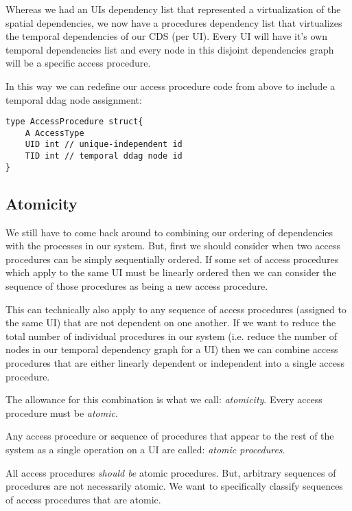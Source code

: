 Whereas we had an UIs dependency list that represented a virtualization of the spatial dependencies, we now have a procedures dependency list that virtualizes the temporal dependencies of our CDS (per UI). Every UI will have it's own temporal dependencies list and every node in this disjoint dependencies graph will be a specific access procedure.

In this way we can redefine our access procedure code from above to include a temporal ddag node assignment:

\begin{verbatim}
type AccessProcedure struct{
	A AccessType
	UID int // unique-independent id
	TID int // temporal ddag node id
}
\end{verbatim}

\subsection{Atomicity}

We still have to come back around to combining our ordering of dependencies with the processes in our system. But, first we should consider when two access procedures can be simply sequentially ordered. If some set of access procedures which apply to the same UI must be linearly ordered then we can consider the sequence of those procedures as being a new access procedure.

This can technically also apply to any sequence of access procedures (assigned to the same UI) that are not dependent on one another. If we want to reduce the total number of individual procedures in our system (i.e. reduce the number of nodes in our temporal dependency graph for a UI) then we can combine access procedures that are either linearly dependent or independent into a single access procedure.

The allowance for this combination is what we call: \textit{atomicity}. Every access procedure must be \textit{atomic}.

\begin{con-def}
	\label{atomic-procedures}
	Any access procedure or sequence of procedures that appear to the rest of the system as a single operation on a UI are called: \textit{atomic procedures}.
\end{con-def}

All access procedures \textit{should be} atomic procedures. But, arbitrary sequences of procedures are not necessarily atomic. We want to specifically classify sequences of access procedures that are atomic.

